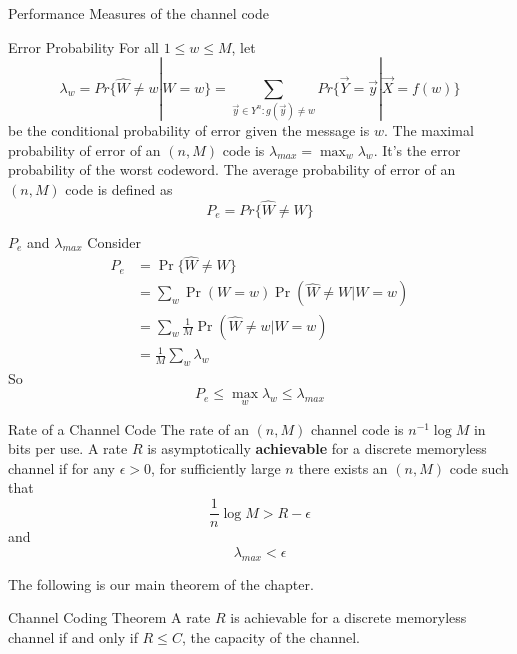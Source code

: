 \documentclass[../main.tex]{subfiles}
\begin{document}
Performance Measures of the channel code
\begin{gbox}{Error Probability}
    For all $1\leq w\leq M$, let \[
    \lambda_w=Pr\{\hat{W}\neq w|W=w\}=\sum_{\vec y\in Y^n:g(\vec y)\neq w}Pr\{\vec Y=\vec y|\vec X=f(w)\}
    \]
    be the conditional probability of error given the message is $w$.
\newline
The maximal probability of error of an $(n,M)$ code is $\lambda_{max}=\max_w\lambda_w$. It's the error probability of the worst codeword.
\newline
The average probability of error of an $(n,M)$ code is defined as \[
P_e=Pr\{\hat{W}\neq W\}
\]
\end{gbox}
$P_e$ and $\lambda_{max}$
Consider \begin{align*}
    P_e &= \Pr\{\hat{W}\neq W\}\\
    &=\sum_w \Pr(W=w) \Pr(\hat{W}\neq W|W=w)\\
    &= \sum_w \frac{1}{M}\Pr(\hat{W}\neq w|W=w)\\
    &=\frac{1}{M}\sum_w \lambda_w
\end{align*}
So \[
P_e\leq \max_w \lambda_w\leq \lambda_{max}
\]
\begin{gbox}{Rate of a Channel Code}
   The rate of an $(n,M)$ channel code is $n^{-1}\log M$ in bits per use.
   \newline
   A rate $R$ is asymptotically \textbf{achievable} for a discrete memoryless channel if for any $\epsilon>0$, for sufficiently large $n$ there exists an $(n,M)$ code such that \[
   \frac{1}{n}\log M>R-\epsilon
   \]
   and \[
   \lambda_{max}<\epsilon
   \]
   \end{gbox}
   The following is our main theorem of the chapter.
   \begin{bbox}{Channel Coding Theorem}
       A rate $R$ is achievable for a discrete memoryless channel if and only if $R\leq C$, the capacity of the channel.
   \end{bbox}
\end{document}
